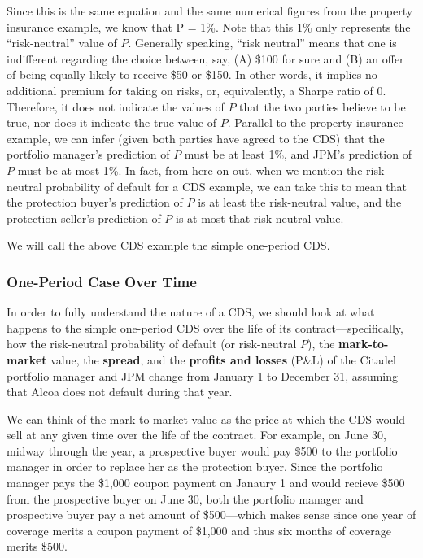 \documentclass{jss}
\begin{document}
Since this is the same equation and the same numerical figures from the property insurance example, we know that P = 1\%. Note that this 1\% only represents the ``risk-neutral'' value of $P$. Generally speaking, ``risk neutral'' means that one is indifferent regarding the choice between, say, (A) \$100 for sure and (B) an offer of being equally likely to receive \$50 or \$150. In other words, it implies no additional premium for taking on risks, or, equivalently, a Sharpe ratio of $0$. Therefore, it does not indicate the values of $P$ that the two parties believe to be true, nor does it indicate the true value of $P$. Parallel to the property insurance example, we can infer (given both parties have agreed to the CDS) that the portfolio manager's prediction of $P$ must be at least 1\%, and JPM's prediction of $P$ must be at most 1\%. In fact, from here on out, when we mention the risk-neutral probability of default for a CDS example, we can take this to mean that the protection buyer's prediction of $P$ is at least the risk-neutral value, and the protection seller's prediction of $P$ is at most that risk-neutral value.

We will call the above CDS example the simple one-period CDS.

\subsubsection{One-Period Case Over Time}
\label{sec:OnePeriodOverTime}

In order to fully understand the nature of a CDS, we should look at what happens to the simple one-period CDS over the life of its contract---specifically, how the risk-neutral probability of default (or risk-neutral $P$), the \textbf{mark-to-market} value, the \textbf{spread}, and the \textbf{profits and losses} (P&L) of the Citadel portfolio manager and JPM change from January 1 to December 31, assuming that Alcoa does not default during that year.

We can think of the mark-to-market value as the price at which the CDS would sell at any given time over the life of the contract. For example, on June 30, midway through the year, a prospective buyer would pay \$500 to the portfolio manager in order to replace her as the protection buyer. Since the portfolio manager pays the \$1,000 coupon payment on Janaury 1 and would recieve \$500 from the prospective buyer on June 30, both the portfolio manager and prospective buyer pay a net amount of \$500---which makes sense since one year of coverage merits a coupon payment of \$1,000 and thus six months of coverage merits \$500. 
\end{document}
